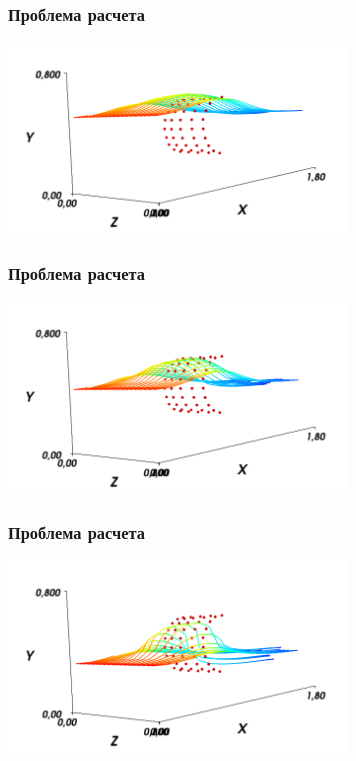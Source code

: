 \documentclass[14pt, notes]{beamer}
\begin{document}
\begin{frame}
\frametitle{Проблема расчета}
    \begin{center}
    \includegraphics[width=9cm]{images/ibm_results/ibm_slice_asymmetric1_crop.png}
    \end{center}
\end{frame}

\begin{frame}
\frametitle{Проблема расчета}
    \begin{center}
    \includegraphics[width=9cm]{images/ibm_results/ibm_slice_asymmetric2_crop.png}
    \end{center}
\end{frame}

\begin{frame}
\frametitle{Проблема расчета}
    \begin{center}
    \includegraphics[width=9cm]{images/ibm_results/ibm_slice_asymmetric3_crop.png}
    \end{center}
\end{frame}
\end{document}
